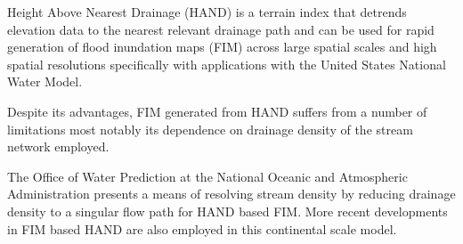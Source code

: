 


\begin{keypoints}
\item Height Above Nearest Drainage (HAND) is a terrain index that detrends elevation data to the nearest relevant drainage path and can be used for rapid generation of flood inundation maps (FIM) across large spatial scales and high spatial resolutions specifically with applications with the United States National Water Model.
\item Despite its advantages, FIM generated from HAND suffers from a number of limitations most notably its dependence on drainage density of the stream network employed.
\item The Office of Water Prediction at the National Oceanic and Atmospheric Administration presents a means of resolving stream density by reducing drainage density to a singular flow path for HAND based FIM. More recent developments in FIM based HAND are also employed in this continental scale model. 
\end{keypoints}
